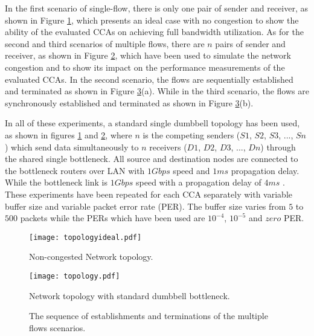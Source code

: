 \documentclass[preprint,3p,times,twocolumn,authoryear]{elsarticle}
\begin{document}
In the first scenario of single-flow, there is only one pair of sender and receiver, as shown in Figure \ref{fig:topology-ideal}, which presents an ideal case with no congestion to show the ability of the evaluated CCAs on achieving full bandwidth utilization. As for the second and third scenarios of multiple flows, there are $n$ pairs of sender and receiver, as shown in Figure \ref{fig:topology}, which have been used to simulate the network congestion and to show its impact on the performance measurements of the evaluated CCAs. In the second scenario, the flows are sequentially established and terminated as shown in Figure \ref{fig:multi-flows-sequence}(a). While in the third scenario, the flows are synchronously established and terminated as shown in Figure \ref{fig:multi-flows-sequence}(b).

In all of these experiments, a standard single dumbbell topology has been used, as shown in figures \ref{fig:topology-ideal} and \ref{fig:topology}, where $n$ is the competing senders ($S1$, $S2$, $S3$, ..., $Sn$) which send data simultaneously to $n$ receivers ($D1$, $D2$, $D3$, ..., $Dn$) through the shared single bottleneck. All source and destination nodes are connected to the bottleneck routers over LAN with $1Gbps$ speed and $1ms$ propagation delay. While the bottleneck link is $1Gbps$ speed with a propagation delay of $4ms$ \citep{Wang2013}. These experiments have been repeated for each CCA separately with variable buffer size and variable packet error rate (PER). The buffer size varies from $5$ to $500$ packets while the PERs which have been used are $10^{-4}$, $10^{-5}$ and $zero$ PER. 

\begin{figure} [t!]
\centering
\texttt{[image: topologyideal.pdf]}
\caption{Non-congested Network topology.}
\label{fig:topology-ideal}
\end{figure}

\begin{figure} [t!]
\centering
\texttt{[image: topology.pdf]}
\caption{Network topology with standard dumbbell bottleneck.}
\label{fig:topology}
\end{figure}

\begin{figure} [t!]
	\centering
	\begin{center}
	\end{center}
	\caption{The sequence of establishments and terminations of the multiple flows scenarios.}
	\label{fig:multi-flows-sequence}
\end{figure}
\end{document}
